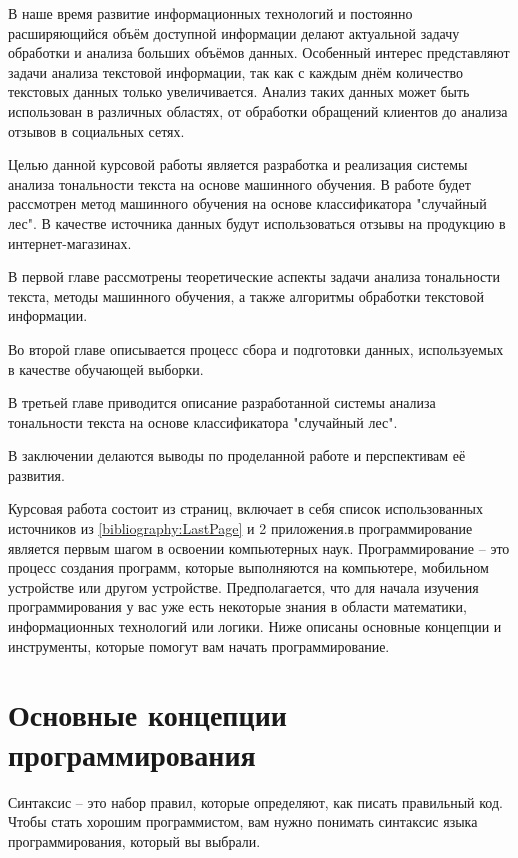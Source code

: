 \documentclass[draft]{article}
\begin{document}
В наше время развитие информационных технологий и постоянно расширяющийся объём доступной информации делают актуальной задачу обработки и анализа больших объёмов данных. Особенный интерес представляют задачи анализа текстовой информации, так как с каждым днём количество текстовых данных только увеличивается. Анализ таких данных может быть использован в различных областях, от обработки обращений клиентов до анализа отзывов в социальных сетях.

Целью данной курсовой работы является разработка и реализация системы анализа тональности текста на основе машинного обучения. В работе будет рассмотрен метод машинного обучения на основе классификатора "случайный лес". В качестве источника данных будут использоваться отзывы на продукцию в интернет-магазинах. 

В первой главе рассмотрены теоретические аспекты задачи анализа тональности текста, методы машинного обучения, а также алгоритмы обработки текстовой информации. 

Во второй главе описывается процесс сбора и подготовки данных, используемых в качестве обучающей выборки. 

В третьей главе приводится описание разработанной системы анализа тональности текста на основе классификатора "случайный лес".

В заключении делаются выводы по проделанной работе и перспективам её развития. 

Курсовая работа состоит из \pageref{LastPage} страниц, включает в себя список использованных источников из \ref{bibliography:LastPage} и 2 приложения. в программирование является первым шагом в освоении компьютерных наук. Программирование – это процесс создания программ, которые выполняются на компьютере, мобильном устройстве или другом устройстве. Предполагается, что для начала изучения программирования у вас уже есть некоторые знания в области математики, информационных технологий или логики. Ниже описаны основные концепции и инструменты, которые помогут вам начать программирование.

\section{Основные концепции программирования}

Синтаксис – это набор правил, которые определяют, как писать правильный код. Чтобы стать хорошим программистом, вам нужно понимать синтаксис языка программирования, который вы выбрали.
\end{document}
